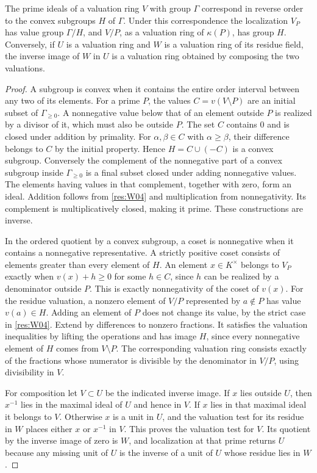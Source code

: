 \begin{theorem}\label{res:W05}
The prime ideals of a valuation ring \(V\) with group \(\Gamma\) correspond in reverse order to the convex subgroups \(H\) of \(\Gamma\). Under this correspondence the localization \(V_P\) has value group \(\Gamma/H\), and \(V/P\), as a valuation ring of \(\kappa(P)\), has group \(H\). Conversely, if \(U\) is a valuation ring and \(W\) is a valuation ring of its residue field, the inverse image of \(W\) in \(U\) is a valuation ring obtained by composing the two valuations.
\end{theorem}
\begin{proof}
A subgroup is convex when it contains the entire order interval between any two of its elements. For a prime \(P\), the values \(C=v(V\setminus P)\) are an initial subset of \(\Gamma_{\ge0}\). A nonnegative value below that of an element outside \(P\) is realized by a divisor of it, which must also be outside \(P\). The set \(C\) contains \(0\) and is closed under addition by primality. For \(\alpha,\beta\in C\) with \(\alpha\ge\beta\), their difference belongs to \(C\) by the initial property. Hence \(H=C\cup(-C)\) is a convex subgroup. Conversely the complement of the nonnegative part of a convex subgroup inside \(\Gamma_{\ge0}\) is a final subset closed under adding nonnegative values. The elements having values in that complement, together with zero, form an ideal. Addition follows from \ref{res:W04} and multiplication from nonnegativity. Its complement is multiplicatively closed, making it prime. These constructions are inverse.

In the ordered quotient by a convex subgroup, a coset is nonnegative when it contains a nonnegative representative. A strictly positive coset consists of elements greater than every element of \(H\). An element \(x\in K^\times\) belongs to \(V_P\) exactly when \(v(x)+h\ge0\) for some \(h\in C\), since \(h\) can be realized by a denominator outside \(P\). This is exactly nonnegativity of the coset of \(v(x)\). For the residue valuation, a nonzero element of \(V/P\) represented by \(a\notin P\) has value \(v(a)\in H\). Adding an element of \(P\) does not change its value, by the strict case in \ref{res:W04}. Extend by differences to nonzero fractions. It satisfies the valuation inequalities by lifting the operations and has image \(H\), since every nonnegative element of \(H\) comes from \(V\setminus P\). The corresponding valuation ring consists exactly of the fractions whose numerator is divisible by the denominator in \(V/P\), using divisibility in \(V\).

For composition let \(V\subset U\) be the indicated inverse image. If \(x\) lies outside \(U\), then \(x^{-1}\) lies in the maximal ideal of \(U\) and hence in \(V\). If \(x\) lies in that maximal ideal it belongs to \(V\). Otherwise \(x\) is a unit in \(U\), and the valuation test for its residue in \(W\) places either \(x\) or \(x^{-1}\) in \(V\). This proves the valuation test for \(V\). Its quotient by the inverse image of zero is \(W\), and localization at that prime returns \(U\) because any missing unit of \(U\) is the inverse of a unit of \(U\) whose residue lies in \(W\).
\end{proof}

